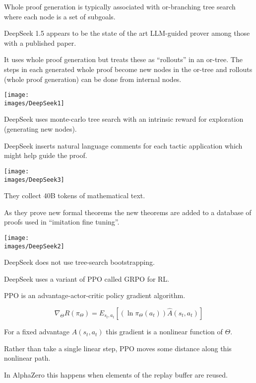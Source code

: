 {\vfill
Whole proof generation is typically associated with or-branching tree search where each node is a set of subgoals.


DeepSeek 1.5 appears to be the state of the art LLM-guided prover among those with a published paper.

\vfill
It uses whole proof generation but treats these as ``rollouts'' in an or-tree.  The steps in each generated whole proof
become new nodes in the or-tree and rollouts (whole proof generation) can be done from internal nodes.


\centerline{\texttt{[image: \\images/DeepSeek1]}}


DeepSeek uses monte-carlo tree search with an intrinsic reward for exploration (generating new nodes).


\vfill
DeepSeek inserts natural language comments for each tactic application which might help guide the proof.


\centerline{\texttt{[image: \\images/DeepSeek3]}}

\vfill
They collect 40B tokens of mathematical text.



As they prove new formal theorems the new theorems are added to a database of proofs
used in ``imitation fine tuning''.

\vfill
\centerline{\texttt{[image: \\images/DeepSeek2]}}

\vfill
DeepSeek does not use tree-search bootstrapping.


DeepSeek uses a variant of PPO called GRPO for RL.

\vfill
PPO is an advantage-actor-critic policy gradient algorithm.

$$\nabla_\Theta R(\pi_\Theta) = E_{s_t,a_t}\left[(\ln \pi_\Theta(a_t)) \hat{A}(s_t,a_t)\right]$$

\vfill
For a fixed advantage $\hat{A}(s_t,a_t)$ this gradient is a nonlinear function of $\Theta$.

\vfill
Rather than take a single linear step, PPO moves some distance along this nonlinear path.

\vfill
In AlphaZero this happens when elements of the replay buffer are reused.

}
